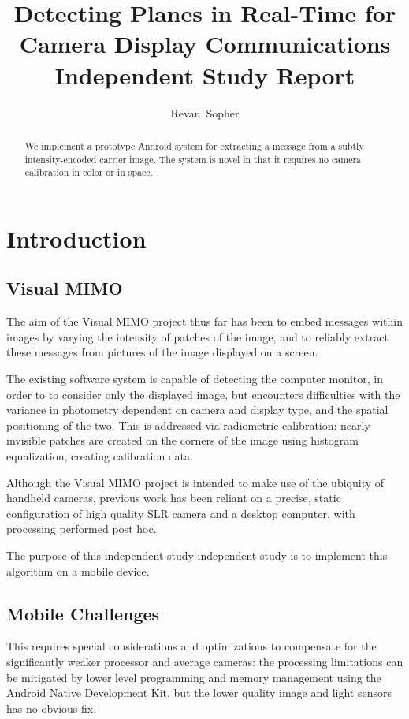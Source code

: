 \documentclass[11pt, letterpaper]{article}
\author{Revan~Sopher}
\title{Detecting Planes in Real-Time for Camera Display Communications\\
{\large Independent Study Report}}
\begin{document}
\maketitle

\begin{abstract}
We implement a prototype Android system for extracting a message from a subtly intensity-encoded carrier image.
The system is novel in that it requires no camera calibration in color or in space.
\end{abstract}

\section{Introduction}

\subsection{Visual MIMO}
The aim of the Visual MIMO project thus far has been to embed messages within images by varying the intensity of patches of the image, and to reliably extract these messages from pictures of the image displayed on a screen.

The existing software system is capable of detecting the computer monitor, in order to to consider only the displayed image, but encounters difficulties with the variance in photometry dependent on camera and display type, and the spatial positioning of the two.
This is addressed via radiometric calibration: nearly invisible patches are created on the corners of the image using histogram equalization, creating calibration data.

Although the Visual MIMO project is intended to make use of the ubiquity of handheld cameras, previous work has been reliant on a precise, static configuration of high quality SLR camera and a desktop computer, with processing performed post hoc.

The purpose of this independent study independent study is to implement this algorithm on a mobile device.

\subsection{Mobile Challenges}

This requires special considerations and optimizations to compensate for the significantly weaker processor and average cameras: the processing limitations can be mitigated by lower level programming and memory management using the Android Native Development Kit, but the lower quality image and light sensors has no obvious fix.
\end{document}
